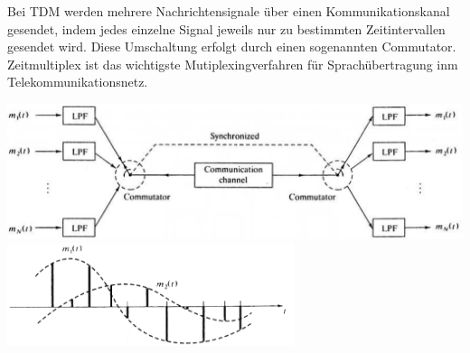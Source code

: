 Bei TDM werden mehrere Nachrichtensignale über einen Kommunikationskanal gesendet, indem jedes
einzelne Signal jeweils nur zu bestimmten Zeitintervallen gesendet wird. Diese Umschaltung erfolgt
durch einen sogenannten Commutator. \\
Zeitmultiplex ist das wichtigste Mutiplexingverfahren für
Sprachübertragung inm Telekommunikationsnetz.
\begin{center}
    \includegraphics[width=14cm]{bilder/multiplex_tdm_blockdiagramm.png} \\
    \includegraphics[height=3cm]{bilder/multiplex_tdm_zeitdiagramm.png}     
\end{center}